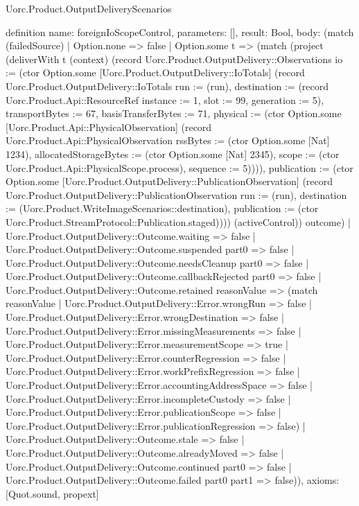\begin{lexlean}{Uorc.Product.OutputDeliveryScenarios}
\begin{semanticmodule}
definition{
  name: foreignIoScopeControl,
  parameters: [],
  result: Bool,
  body: (match (failedSource)
    | Option.none => false
    | Option.some t => (match (project (deliverWith t (context) (record Uorc.Product.OutputDelivery::Observations {io := (ctor Option.some [Uorc.Product.OutputDelivery::IoTotals] (record Uorc.Product.OutputDelivery::IoTotals {run := (run), destination := (record Uorc.Product.Api::ResourceRef {instance := 1, slot := 99, generation := 5}), transportBytes := 67, basisTransferBytes := 71, physical := (ctor Option.some [Uorc.Product.Api::PhysicalObservation] (record Uorc.Product.Api::PhysicalObservation {rssBytes := (ctor Option.some [Nat] 1234), allocatedStorageBytes := (ctor Option.some [Nat] 2345), scope := (ctor Uorc.Product.Api::PhysicalScope.process), sequence := 5}))})), publication := (ctor Option.some [Uorc.Product.OutputDelivery::PublicationObservation] (record Uorc.Product.OutputDelivery::PublicationObservation {run := (run), destination := (Uorc.Product.WriteImageScenarios::destination), publication := (ctor Uorc.Product.StreamProtocol::Publication.staged)}))}) (activeControl)) outcome)
      | Uorc.Product.OutputDelivery::Outcome.waiting => false
      | Uorc.Product.OutputDelivery::Outcome.suspended part0 => false
      | Uorc.Product.OutputDelivery::Outcome.needsCleanup part0 => false
      | Uorc.Product.OutputDelivery::Outcome.callbackRejected part0 => false
      | Uorc.Product.OutputDelivery::Outcome.retained reasonValue => (match reasonValue
        | Uorc.Product.OutputDelivery::Error.wrongRun => false
        | Uorc.Product.OutputDelivery::Error.wrongDestination => false
        | Uorc.Product.OutputDelivery::Error.missingMeasurements => false
        | Uorc.Product.OutputDelivery::Error.measurementScope => true
        | Uorc.Product.OutputDelivery::Error.counterRegression => false
        | Uorc.Product.OutputDelivery::Error.workPrefixRegression => false
        | Uorc.Product.OutputDelivery::Error.accountingAddressSpace => false
        | Uorc.Product.OutputDelivery::Error.incompleteCustody => false
        | Uorc.Product.OutputDelivery::Error.publicationScope => false
        | Uorc.Product.OutputDelivery::Error.publicationRegression => false)
      | Uorc.Product.OutputDelivery::Outcome.stale => false
      | Uorc.Product.OutputDelivery::Outcome.alreadyMoved => false
      | Uorc.Product.OutputDelivery::Outcome.continued part0 => false
      | Uorc.Product.OutputDelivery::Outcome.failed part0 part1 => false)),
  axioms: [Quot.sound, propext]
}


\end{semanticmodule}
\end{lexlean}
